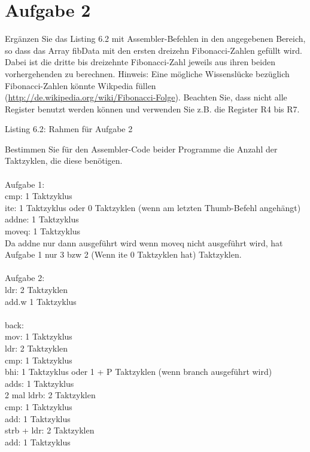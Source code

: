 \section{Aufgabe 2}
Ergänzen Sie das Listing 6.2 mit Assembler-Befehlen in den angegebenen Bereich, so dass das Array fibData mit den ersten dreizehn Fibonacci-Zahlen gefüllt wird. Dabei ist die dritte bis dreizehnte Fibonacci-Zahl jeweils aus ihren beiden vorhergehenden zu berechnen. Hinweis: Eine mögliche Wissenslücke bezüglich Fibonacci-Zahlen könnte Wikpedia füllen (\url{http://de.wikipedia.org/wiki/Fibonacci-Folge}). Beachten Sie, dass nicht alle Register benutzt werden können und verwenden Sie z.B. die Register R4 bis R7.\\

\begin{center}
	Listing 6.2: Rahmen für Aufgabe 2\\
\end{center}
Bestimmen Sie für den Assembler-Code beider Programme die Anzahl der Taktzyklen, die diese benötigen.\\ \\
Aufgabe 1:\\
cmp: 1 Taktzyklus\\
ite: 1 Taktzyklus oder 0 Taktzyklen (wenn am letzten Thumb-Befehl angehängt)\\
addne: 1 Taktzyklus\\
moveq: 1 Taktzyklus\\
Da addne nur dann ausgeführt wird wenn moveq nicht ausgeführt wird, hat Aufgabe 1 nur 3 bzw 2 (Wenn ite 0 Taktzyklen hat) Taktzyklen.\\ \\
Aufgabe 2:\\
ldr: 2 Taktzyklen\\
add.w 1 Taktzyklus\\ \\
back:\\
mov: 1 Taktzyklus\\
ldr: 2 Taktzyklen\\
cmp: 1 Taktzyklus\\
bhi: 1 Taktzyklus oder 1 + P Taktzyklen (wenn branch ausgeführt wird)\\
adds: 1 Taktzyklus\\
2 mal ldrb: 2 Taktzyklen\\
cmp: 1 Taktzyklus\\
add: 1 Taktzyklus\\
strb + ldr: 2 Taktzyklen\\
add: 1 Taktzyklus\\
